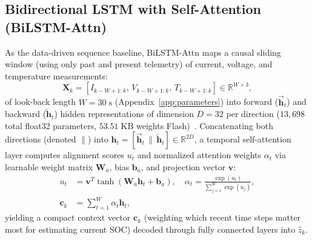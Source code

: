 \documentclass[11pt,a4paper]{article}
\begin{document}
\subsection{Bidirectional LSTM with Self-Attention (BiLSTM-Attn)}
As the data-driven sequence baseline, BiLSTM-Attn maps a causal sliding window (using only past and present telemetry) of current, voltage, and temperature measurements:
\begin{equation}
\mathbf{X}_k = [I_{k-W+1:k},\, V_{k-W+1:k},\, T_{k-W+1:k}] \in \mathbb{R}^{W \times 3},
\end{equation}
of look-back length $W = 30\;\mathrm{s}$ (Appendix~\ref{app:parameters}) into forward ($\overrightarrow{\mathbf{h}}_t$) and backward ($\overleftarrow{\mathbf{h}}_t$) hidden representations of dimension $D = 32$ per direction ($13,698$ total float32 parameters, $53.51\;\mathrm{KB}$ weights Flash)~\cite{Song2019bilstm,Vaswani2017attention}. Concatenating both directions (denoted $\|$) into $\mathbf{h}_t = [\overrightarrow{\mathbf{h}}_t \,\|\, \overleftarrow{\mathbf{h}}_t] \in \mathbb{R}^{2 D}$, a temporal self-attention layer computes alignment scores $u_t$ and normalized attention weights $\alpha_t$ via learnable weight matrix $\mathbf{W}_a$, bias $\mathbf{b}_a$, and projection vector $\mathbf{v}$:
\begin{align}
u_t &= \mathbf{v}^T \tanh(\mathbf{W}_a \mathbf{h}_t + \mathbf{b}_a), \quad \alpha_t = \frac{\exp(u_t)}{\sum_{j=1}^W \exp(u_j)}, \label{eqn:attn_weight}\\
\mathbf{c}_k &= \sum_{t=1}^W \alpha_t \mathbf{h}_t, \label{eqn:attn_context}
\end{align}
yielding a compact context vector $\mathbf{c}_k$ (weighting which recent time steps matter most for estimating current SOC) decoded through fully connected layers into $\hat{z}_k$.
\end{document}
